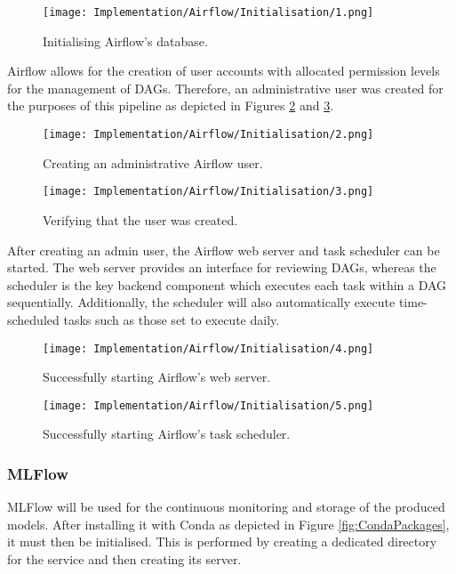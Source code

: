 \begin{figure}[H]
    \centering
    \texttt{[image: Implementation/Airflow/Initialisation/1.png]}
    \caption{Initialising Airflow's database.}
    \label{fig:AirflowInit}
\end{figure}

Airflow allows for the creation of user accounts with allocated permission levels for the management of 
DAGs. Therefore, an administrative user was created for the purposes of this pipeline as depicted in Figures 
\ref{fig:AirflowUser1} and \ref{fig:AirflowUser2}.

\begin{figure}[H]
    \centering
    \texttt{[image: Implementation/Airflow/Initialisation/2.png]}
    \caption{Creating an administrative Airflow user.}
    \label{fig:AirflowUser1}
\end{figure}

\begin{figure}[H]
    \centering
    \texttt{[image: Implementation/Airflow/Initialisation/3.png]}
    \caption{Verifying that the user was created.}
    \label{fig:AirflowUser2}
\end{figure}

After creating an admin user, the Airflow web server and task scheduler can be started. The web server provides 
an interface for reviewing DAGs, whereas the scheduler is the key backend component which executes each task within a 
DAG sequentially. Additionally, the scheduler will also automatically execute time-scheduled tasks such as those set to 
execute daily.

\begin{figure}[H]
    \centering
    \texttt{[image: Implementation/Airflow/Initialisation/4.png]}
    \caption{Successfully starting Airflow's web server.}
    \label{fig:AirflowWebserver}
\end{figure}

\begin{figure}[H]
    \centering
    \texttt{[image: Implementation/Airflow/Initialisation/5.png]}
    \caption{Successfully starting Airflow's task scheduler.}
    \label{fig:AirflowScheduler}
\end{figure}

\subsubsection{MLFlow}
MLFlow will be used for the continuous monitoring and storage of the produced models. 
After installing it with Conda as depicted in Figure \ref{fig:CondaPackages}, it must then 
be initialised. This is performed by creating a dedicated directory for the service and then 
creating its server.

